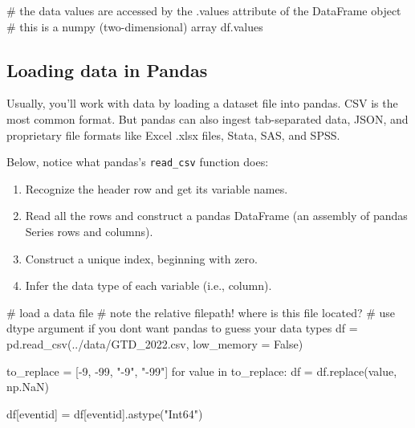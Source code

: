 \documentclass[
  letterpaper,
  DIV=11,
  numbers=noendperiod]{scrreprt}
\newenvironment{Shaded}{\begin{snugshade}}{\end{snugshade}}
\newcommand{\CommentTok}[1]{\textcolor[rgb]{0.37,0.37,0.37}{#1}}
\newcommand{\ControlFlowTok}[1]{\textcolor[rgb]{0.00,0.23,0.31}{#1}}
\newcommand{\DecValTok}[1]{\textcolor[rgb]{0.68,0.00,0.00}{#1}}
\newcommand{\KeywordTok}[1]{\textcolor[rgb]{0.00,0.23,0.31}{#1}}
\newcommand{\NormalTok}[1]{\textcolor[rgb]{0.00,0.23,0.31}{#1}}
\newcommand{\OperatorTok}[1]{\textcolor[rgb]{0.37,0.37,0.37}{#1}}
\newcommand{\StringTok}[1]{\textcolor[rgb]{0.13,0.47,0.30}{#1}}
\newcommand{\VariableTok}[1]{\textcolor[rgb]{0.07,0.07,0.07}{#1}}
\providecommand{\tightlist}{%
  \setlength{\itemsep}{0pt}\setlength{\parskip}{0pt}}\usepackage{longtable,booktabs,array}
\begin{document}
\begin{Shaded}
\begin{Highlighting}[]
\CommentTok{\# the data values are accessed by the .values attribute of the DataFrame object}
\CommentTok{\# this is a numpy (two{-}dimensional) array}
\NormalTok{df.values}
\end{Highlighting}
\end{Shaded}

\subsection{Loading data in Pandas}\label{loading-data-in-pandas}

Usually, you'll work with data by loading a dataset file into pandas.
CSV is the most common format. But pandas can also ingest tab-separated
data, JSON, and proprietary file formats like Excel .xlsx files, Stata,
SAS, and SPSS.

Below, notice what pandas's \texttt{read\_csv} function does:

\begin{enumerate}
\def\labelenumi{\arabic{enumi}.}
\tightlist
\item
  Recognize the header row and get its variable names.
\item
  Read all the rows and construct a pandas DataFrame (an assembly of
  pandas Series rows and columns).
\item
  Construct a unique index, beginning with zero.
\item
  Infer the data type of each variable (i.e., column).
\end{enumerate}

\begin{Shaded}
\begin{Highlighting}[]
\CommentTok{\# load a data file}
\CommentTok{\# note the relative filepath! where is this file located?}
\CommentTok{\# use dtype argument if you don\textquotesingle{}t want pandas to guess your data types}
\NormalTok{df }\OperatorTok{=}\NormalTok{ pd.read\_csv(}\StringTok{\textquotesingle{}../data/GTD\_2022.csv\textquotesingle{}}\NormalTok{, low\_memory }\OperatorTok{=} \VariableTok{False}\NormalTok{)}
\end{Highlighting}
\end{Shaded}

\begin{Shaded}
\begin{Highlighting}[]
\NormalTok{to\_replace }\OperatorTok{=}\NormalTok{ [}\OperatorTok{{-}}\DecValTok{9}\NormalTok{, }\OperatorTok{{-}}\DecValTok{99}\NormalTok{, }\StringTok{"{-}9"}\NormalTok{, }\StringTok{"{-}99"}\NormalTok{]}
\ControlFlowTok{for}\NormalTok{ value }\KeywordTok{in}\NormalTok{ to\_replace:}
\NormalTok{    df }\OperatorTok{=}\NormalTok{ df.replace(value, np.NaN)}

\NormalTok{df[}\StringTok{\textquotesingle{}eventid\textquotesingle{}}\NormalTok{] }\OperatorTok{=}\NormalTok{ df[}\StringTok{\textquotesingle{}eventid\textquotesingle{}}\NormalTok{].astype(}\StringTok{"Int64"}\NormalTok{)}
\end{Highlighting}
\end{Shaded}
\end{document}
